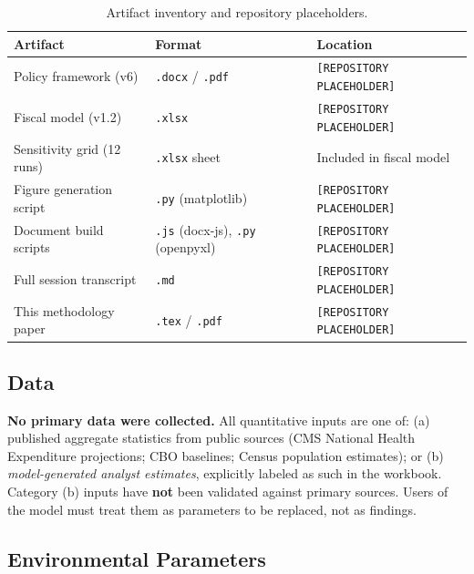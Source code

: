 \documentclass[11pt,a4paper]{article}
\begin{document}
\begin{table}[h!]
\centering
\small
\begin{tabular}{@{}llp{6.2cm}@{}}
\toprule
\textbf{Artifact} & \textbf{Format} & \textbf{Location} \\
\midrule
Policy framework (v6) & \texttt{.docx} / \texttt{.pdf} & \texttt{[REPOSITORY PLACEHOLDER]} \\
Fiscal model (v1.2) & \texttt{.xlsx} & \texttt{[REPOSITORY PLACEHOLDER]} \\
Sensitivity grid (12 runs) & \texttt{.xlsx} sheet & Included in fiscal model \\
Figure generation script & \texttt{.py} (matplotlib) & \texttt{[REPOSITORY PLACEHOLDER]} \\
Document build scripts & \texttt{.js} (docx-js), \texttt{.py} (openpyxl) & \texttt{[REPOSITORY PLACEHOLDER]} \\
Full session transcript & \texttt{.md} & \texttt{[REPOSITORY PLACEHOLDER]} \\
This methodology paper & \texttt{.tex} / \texttt{.pdf} & \texttt{[REPOSITORY PLACEHOLDER]} \\
\bottomrule
\end{tabular}
\caption{Artifact inventory and repository placeholders.}
\end{table}

\subsection{Data}

\textbf{No primary data were collected.} All quantitative inputs are one of: (a) published aggregate statistics from public sources (CMS National Health Expenditure projections; CBO baselines; Census population estimates); or (b) \emph{model-generated analyst estimates}, explicitly labeled as such in the workbook. Category (b) inputs have \textbf{not} been validated against primary sources. Users of the model must treat them as parameters to be replaced, not as findings.

\subsection{Environmental Parameters}
\end{document}
